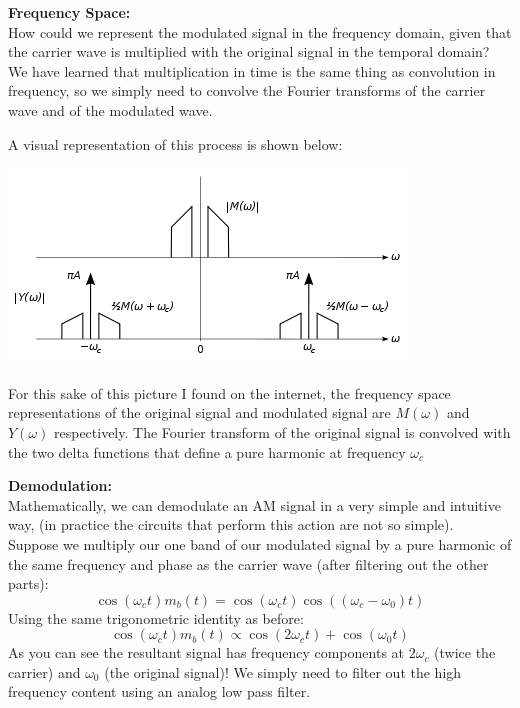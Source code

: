 \documentclass[a4paper]{article}
\numberwithin{equation}{section}
\begin{document}
\textbf{Frequency Space:}\\ 
How could we represent the modulated signal in the frequency domain, given that the carrier wave is multiplied with the original signal in the temporal domain? \\

We have learned that multiplication in time is the same thing as convolution in frequency, so we simply need to convolve the Fourier transforms of the carrier wave and of the modulated wave.

A visual representation of this process is shown below:

\begin{center}
\includegraphics[scale=0.75]{AM_spectrum.png}
\end{center}

For this sake of this picture I found on the internet, the frequency space representations of the original signal and modulated signal are $M(\omega)$ and $Y(\omega)$ respectively. The Fourier transform of the original signal is convolved with the two delta functions that define a pure harmonic at frequency $\omega_c$

\textbf{Demodulation:}\\ 
Mathematically, we can demodulate an AM signal in a very simple and intuitive way, (in practice the circuits that perform this action are not so simple). \\

Suppose we multiply our one band of our modulated signal by a pure harmonic of the same frequency and phase as the carrier wave (after filtering out the other parts):
\begin{equation}
\cos{(\omega_c t)}m_b(t)=\cos{(\omega_c t)}\cos{((\omega_c-\omega_0)t)}
\end{equation}
Using the same trigonometric identity as before:
\begin{equation}
\cos{(\omega_c t)}m_b(t) \propto \cos{(2\omega_c t)}+\cos{(\omega_0 t)}
\end{equation}
As you can see the resultant signal has frequency components at $2\omega_c$ (twice the carrier) and $\omega_0$ (the original signal)! We simply need to filter out the high frequency content using an analog low pass filter.
\end{document}
